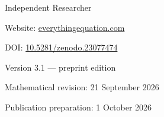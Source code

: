 \documentclass[11pt,a4paper]{article}
\theoremstyle{definition}
\theoremstyle{remark}\newtheorem{remark}[theorem]{Remark}
\begin{document}
\hypersetup{pageanchor=false}
\begin{titlepage}
\vspace*{16mm}
\par
\vspace{23mm}
\par
\vspace{12mm}
\par
\vspace{14mm}
\par
\vfill
\noindent Independent Researcher\par
\noindent Website: \href{https://everythingequation.com}{everythingequation.com}\par
\noindent DOI: \href{https://doi.org/10.5281/zenodo.23077474}{10.5281/zenodo.23077474}\par
\noindent Version 3.1 --- preprint edition\par
\noindent Mathematical revision: 21 September 2026\par
\noindent Publication preparation: 1 October 2026
\end{titlepage}
\hypersetup{pageanchor=true}
\setcounter{page}{1}
\end{document}
